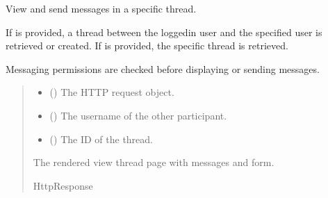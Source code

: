 \documentclass[letterpaper,10pt,english]{sphinxmanual}
\begin{document}
\begin{fulllineitems}
\label{\detokenize{modules/views:interactions.views.view_thread}}
\pysigstartsignatures
{}
\pysigstopsignatures
\sphinxAtStartPar
View and send messages in a specific thread.

\sphinxAtStartPar
If  is provided, a thread between the logged\sphinxhyphen{}in user and
the specified user is retrieved or created. If  is provided,
the specific thread is retrieved.

\sphinxAtStartPar
Messaging permissions are checked before displaying or sending messages.
\begin{quote}\begin{description}
\begin{itemize}
\item {} 
\sphinxAtStartPar
{} () \textendash{} The HTTP request object.

\item {} 
\sphinxAtStartPar
{} (\sphinxstyleliteralemphasis{\sphinxupquote{, }}) \textendash{} The username of the other participant.

\item {} 
\sphinxAtStartPar
{} (\sphinxstyleliteralemphasis{\sphinxupquote{, }}) \textendash{} The ID of the thread.

\end{itemize}

\sphinxAtStartPar
The rendered view thread page with messages and form.

\sphinxAtStartPar
HttpResponse

\end{description}\end{quote}

\end{fulllineitems}
\end{document}
